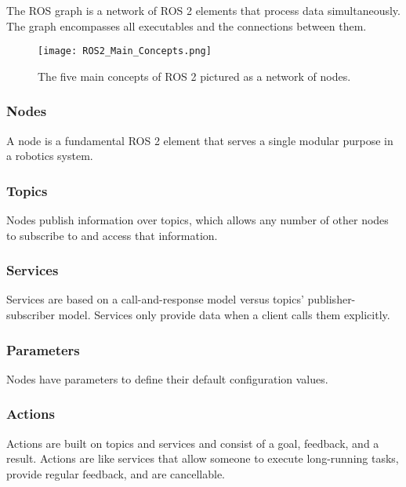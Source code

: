 The ROS graph is a network of ROS 2 elements that process data simultaneously. The graph encompasses all executables and the connections between them.

\begin{figure}[H]
    \centering
    \texttt{[image: ROS2\_Main\_Concepts.png]}
    \caption{The five main concepts of ROS 2 pictured as a network of nodes.}
    \label{fig:ROS 2 main concepts}
\end{figure}

\subsubsection{Nodes} \label{sec:ROS Nodes}
A node is a fundamental ROS 2 element that serves a single modular purpose in a robotics system. \cite{ros2_documentation}

\subsubsection{Topics} \label{sec:ROS Topics}
Nodes publish information over topics, which allows any number of other nodes to subscribe to and access that information. \cite{ros2_documentation}

\subsubsection{Services} \label{sec:ROS Services}
Services are based on a call-and-response model versus topics’ publisher-subscriber model. Services only provide data when a client calls them explicitly. \cite{ros2_documentation}

\subsubsection{Parameters} \label{sec:ROS Parameters}
Nodes have parameters to define their default configuration values. \cite{ros2_documentation}

\subsubsection{Actions} \label{sec:ROS Actions}
Actions are built on topics and services and consist of a goal, feedback, and a result. Actions are like services that allow someone to execute long-running tasks, provide regular feedback, and are cancellable. \cite{ros2_documentation}

